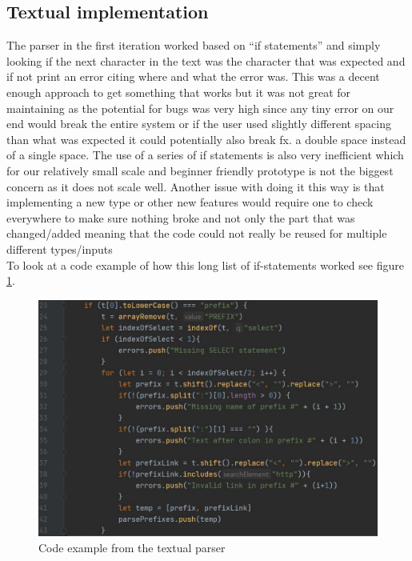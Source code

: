 \subsection{Textual implementation}
The parser in the first iteration worked based on “if statements” and simply looking if the next character in the text was the character that was expected and if not print an error citing where and what the error was. This was a decent enough approach to get something that works but it was not great for maintaining as the potential for bugs was very high since any tiny error on our end would break the entire system or if the user used slightly different spacing than what was expected it could potentially also break fx. a double space instead of a single space. The use of a series of if statements is also very inefficient which for our relatively small scale and beginner friendly prototype is not the biggest concern as it does not scale well. Another issue with doing it this way is that implementing a new type or other new features would require one to check everywhere to make sure nothing broke and not only the part that was changed/added meaning that the code could not really be reused for multiple different types/inputs\\
To look at a code example of how this long list of if-statements worked see figure \ref{fig:textual-parser}.
\begin{figure}[H]
    \centering
    \includegraphics[width=1\linewidth]{figures/textual-code-first.pdf}
    \caption{Code example from the textual parser}
    \label{fig:textual-parser}
\end{figure}
